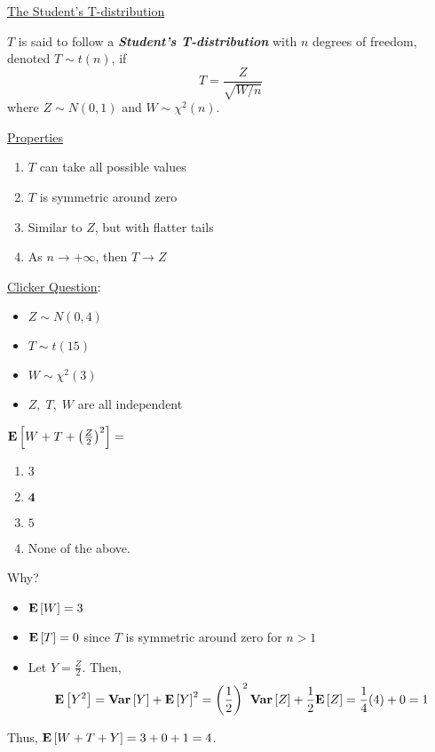\underline{The Student's T-distribution}
\begin{defbox}
    \begin{definition}
        $ T $ is said to follow a \textbf{\emph{Student's T-distribution}} with
        $ n $ degrees of freedom, denoted $ T \sim t(n) $, if
        \[ T=\frac{Z}{\sqrt{W/n}}  \]
        where $ Z \sim N(0,1) $ and $ W \sim \chi^2(n) $.
    \end{definition}
\end{defbox}
\underline{Properties}
\begin{enumerate}[label=(\roman*)]
    \item $ T $ can take all possible values
    \item $ T $ is symmetric around zero
    \item Similar to $ Z $, but with flatter tails
    \item As $ n\rightarrow+\infty $, then $ T\rightarrow Z $
\end{enumerate}
\underline{Clicker Question}:
\begin{itemize}
    \item $ Z \sim N(0,4) $
    \item $ T \sim t(15) $
    \item $ W \sim \chi^2(3) $
    \item $ Z,\;T,\;W $ are all independent
\end{itemize}
$ \bm{\mathrm{E}}\left[W+T+\left( \frac{Z}{2} \right)^2\right] = $
\begin{enumerate}[label=(\Alph*)]
    \item $ 3 $
    \item $ \bm{4} $
    \item $ 5 $
    \item None of the above.
\end{enumerate}
Why?
\begin{itemize}
    \item $ \bm{\mathrm{E}}\left[W\right]=3 $
    \item $ \bm{\mathrm{E}}\left[T\right]=0 $ since $ T $ is symmetric around zero for $ n>1 $
    \item Let $ Y=\frac{Z}{2} $. Then,
          \[ \bm{\mathrm{E}}\left[Y^2\right]=\bm{\mathrm{Var}}\left[Y\right]+\bm{\mathrm{E}}\left[Y\right]^2
              =\left( \frac{1}{2} \right)^2 \bm{\mathrm{Var}}\left[Z\right]+\frac{1}{2} \bm{\mathrm{E}}\left[Z\right]
              =\frac{1}{4}(4)+0
              =1 \]
\end{itemize}
Thus, $ \bm{\mathrm{E}}\left[W+T+Y\right]=3+0+1=4 $.

